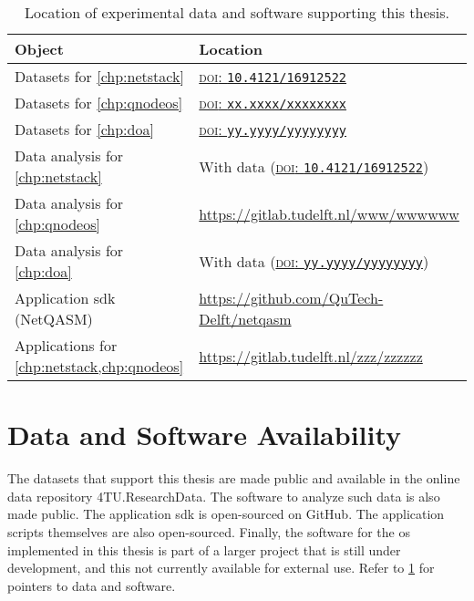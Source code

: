 \begin{table}[t]
    \centering
    \begin{tabularx}{\linewidth}{ll}
        \toprule
        \textbf{Object}                                  & \textbf{Location}                                                                            \\
        \midrule
        Datasets for \cref{chp:netstack}                 & \href{https://doi.org/10.4121/16912522}{\textsc{doi}: \texttt{10.4121/16912522}}             \\
        Datasets for \cref{chp:qnodeos}                  & \href{https://doi.org/xx.xxxx/xxxxxxxx}{\textsc{doi}: \texttt{xx.xxxx/xxxxxxxx}}             \\
        Datasets for \cref{chp:doa}                      & \href{https://doi.org/yy.yyyy/yyyyyyyy}{\textsc{doi}: \texttt{yy.yyyy/yyyyyyyy}}             \\
        Data analysis for \cref{chp:netstack}            & With data (\href{https://doi.org/10.4121/16912522}{\textsc{doi}: \texttt{10.4121/16912522}}) \\
        Data analysis for \cref{chp:qnodeos}             & \url{https://gitlab.tudelft.nl/www/wwwwww}                                                   \\
        Data analysis for \cref{chp:doa}                 & With data (\href{https://doi.org/yy.yyyy/yyyyyyyy}{\textsc{doi}: \texttt{yy.yyyy/yyyyyyyy}}) \\
        Application \acrshort{sdk} (NetQASM)             & \url{https://github.com/QuTech-Delft/netqasm}                                                \\
        Applications for \cref{chp:netstack,chp:qnodeos} & \url{https://gitlab.tudelft.nl/zzz/zzzzzz}                                                   \\
        \bottomrule
    \end{tabularx}
    \caption{
        Location of experimental data and software supporting this thesis.
    }
    \label{tab:data-and-soft}
\end{table}

\section{Data and Software Availability}

The datasets that support this thesis are made public and available in the online data repository
4TU.ResearchData. The software to analyze such data is also made public. The application
\acrfull{sdk} is open-sourced on GitHub. The application scripts themselves are also open-sourced.
Finally, the software for the \acrlong{os} implemented in this thesis is part of a larger project
that is still under development, and this not currently available for external use. Refer to
\cref{tab:data-and-soft} for pointers to data and software.

